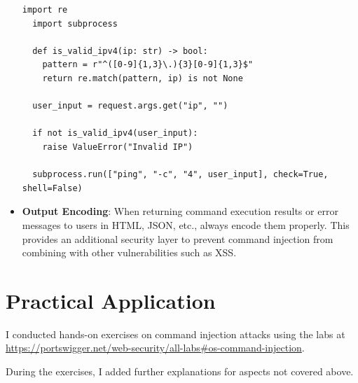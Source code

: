 \documentclass{article}
\begin{document}
\begin{itemize}
  \begin{lstlisting}[caption={Python: Using subprocess.run (shell=False) with Input Validation}]
  import re
  import subprocess

  def is_valid_ipv4(ip: str) -> bool:
    pattern = r"^([0-9]{1,3}\.){3}[0-9]{1,3}$"
    return re.match(pattern, ip) is not None

  user_input = request.args.get("ip", "")

  if not is_valid_ipv4(user_input):
    raise ValueError("Invalid IP")

  subprocess.run(["ping", "-c", "4", user_input], check=True, shell=False)
  \end{lstlisting}

  \item \textbf{Output Encoding}: When returning command execution results or error messages to users in HTML, JSON, etc., always encode them properly. This provides an additional security layer to prevent command injection from combining with other vulnerabilities such as XSS.
\end{itemize}

\newpage
\section*{Practical Application}
I conducted hands-on exercises on command injection attacks using the labs at \url{https://portswigger.net/web-security/all-labs#os-command-injection}.

During the exercises, I added further explanations for aspects not covered above.
\end{document}
